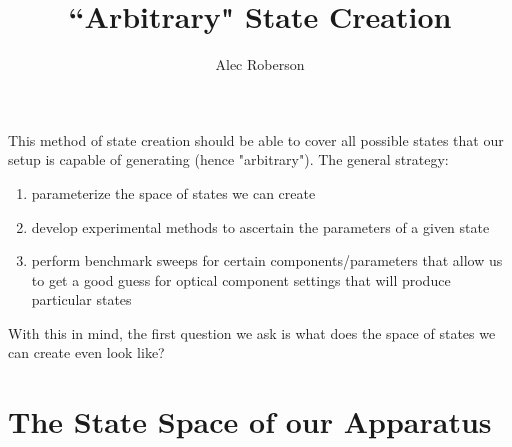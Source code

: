 \documentclass{paper}[11pt]
\title{``Arbitrary" State Creation}
\author{Alec Roberson}
\begin{document}
	\maketitle
	This method of state creation should be able to cover all possible states that our setup is capable of generating (hence "arbitrary"). The general strategy:
	\begin{enumerate}
		\item parameterize the space of states we can create
		\item develop experimental methods to ascertain the parameters of a given state
		\item perform benchmark sweeps for certain components/parameters that allow us to get a good guess for optical component settings that will produce particular states
	\end{enumerate} 	
	With this in mind, the first question we ask is what does the space of states we can create even look like?
	
	\section{The State Space of our Apparatus}
	
\end{document}
